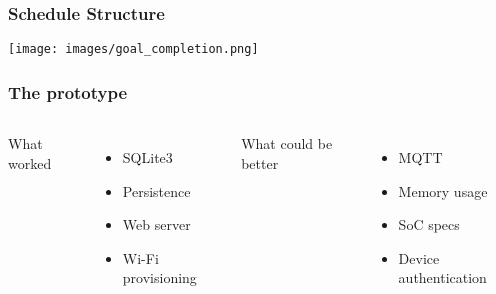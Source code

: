\documentclass{beamer}
\begin{document}
\frame{\titlepage}

\begin{frame}
  \frametitle{Schedule Structure}
  \texttt{[image: images/goal\_completion.png]}
\end{frame}

\begin{frame}
  \frametitle{The prototype}

  \begin{columns}
    What worked
    \begin{itemize}
      \item SQLite3
      \item Persistence
      \item Web server
      \item Wi-Fi provisioning
    \end{itemize}

    What could be better
    \begin{itemize}
      \item MQTT
      \item Memory usage
      \item SoC specs
      \item Device authentication
    \end{itemize}
  \end{columns}


\end{frame}
\end{document}
